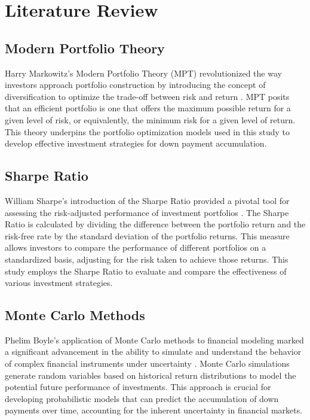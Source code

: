 \section{Literature Review}
\subsection{Modern Portfolio Theory}
Harry Markowitz’s Modern Portfolio Theory (MPT) revolutionized the way investors approach portfolio construction by introducing the concept of diversification to optimize the trade-off between risk and return \citep{markowitz1952portfolio}. MPT posits that an efficient portfolio is one that offers the maximum possible return for a given level of risk, or equivalently, the minimum risk for a given level of return. This theory underpins the portfolio optimization models used in this study to develop effective investment strategies for down payment accumulation.

\subsection{Sharpe Ratio}
William Sharpe’s introduction of the Sharpe Ratio provided a pivotal tool for assessing the risk-adjusted performance of investment portfolios \citep{sharpe1966mutual}. The Sharpe Ratio is calculated by dividing the difference between the portfolio return and the risk-free rate by the standard deviation of the portfolio returns. This measure allows investors to compare the performance of different portfolios on a standardized basis, adjusting for the risk taken to achieve those returns. This study employs the Sharpe Ratio to evaluate and compare the effectiveness of various investment strategies.

\subsection{Monte Carlo Methods}
Phelim Boyle’s application of Monte Carlo methods to financial modeling marked a significant advancement in the ability to simulate and understand the behavior of complex financial instruments under uncertainty \citep{boyle1977options}. Monte Carlo simulations generate random variables based on historical return distributions to model the potential future performance of investments. This approach is crucial for developing probabilistic models that can predict the accumulation of down payments over time, accounting for the inherent uncertainty in financial markets.

